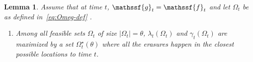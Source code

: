 \documentclass[journal, twocolumn, 10pt]{IEEEtran}
\newtheorem{lemma}{Lemma}
\newcommand{\rvf}{{\mathssf{f}}}    %
\newcommand{\rvg}{{\mathssf{g}}}    %
\begin{document}
{%

\begin{lemma}
\label{lem:GM-ME}
Assume that at time $t$, $\rvg_t =\rvf_t$ and let $\Omega_t$ be as defined in~\eqref{eq:Omeg-def} .%
\begin{enumerate}
\item Among all feasible sets $\Omega_t$  of size  $|\Omega_t|=\theta$, 
$\lambda_{t}(\Omega_t)$ and $\gamma_{t}(\Omega_t)$ are maximized by a set $\Omega^{\star}_t(\theta)$
where all the erasures happen in the closest possible locations to time $t$. 
  


\end{enumerate}
\end{lemma}}
\end{document}
